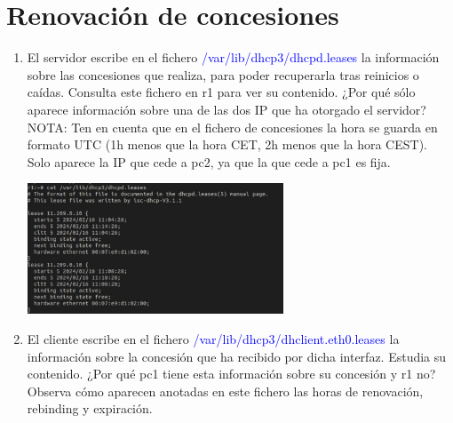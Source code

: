\documentclass[12pt, a4paper]{report}
\begin{document}
\chapter{Renovación de concesiones}
\begin{enumerate}
	\item El servidor escribe en el fichero \textcolor{blue}{/var/lib/dhcp3/dhcpd.leases} la información sobre las concesiones que
	realiza, para poder recuperarla tras reinicios o caídas. Consulta este fichero en r1 para ver su contenido.
	¿Por qué sólo aparece información sobre una de las dos IP que ha otorgado el servidor? NOTA: Ten en
	cuenta que en el fichero de concesiones la hora se guarda en formato UTC (1h menos que la hora CET,
	2h menos que la hora CEST).\\
	
	Solo aparece la IP que cede a pc2, ya que la que cede a pc1 es fija.
	\begin{center}
		\includegraphics[width=0.6\textwidth]{ej1_3}
	\end{center}
	\item El cliente escribe en el fichero \textcolor{blue}{/var/lib/dhcp3/dhclient.eth0.leases} la información sobre la concesión
	que ha recibido por dicha interfaz. Estudia su contenido. ¿Por qué pc1 tiene esta información sobre su
	concesión y r1 no? Observa cómo aparecen anotadas en este fichero las horas de renovación, rebinding y
	expiración.\\
	

\end{enumerate}
\end{document}
